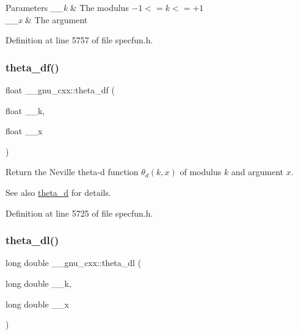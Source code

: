 \begin{DoxyParams}{Parameters}
{\em \+\_\+\+\_\+k} & The modulus $ -1 <= k <= +1 $ \\
\hline
{\em \+\_\+\+\_\+x} & The argument \\
\hline
\end{DoxyParams}


Definition at line 5757 of file specfun.\+h.

\mbox{\label{group__gnu__math__spec__func_gad2dc6fcaf54d25cbfaad082623941118}} 
\subsubsection{\texorpdfstring{theta\+\_\+df()}{theta\_df()}}
{\footnotesize\ttfamily float \+\_\+\+\_\+gnu\+\_\+cxx\+::theta\+\_\+df (\begin{DoxyParamCaption}\item[{float}]{\+\_\+\+\_\+k,  }\item[{float}]{\+\_\+\+\_\+x }\end{DoxyParamCaption})\hspace{0.3cm}{\ttfamily [inline]}}

Return the Neville theta-\/d function $ \theta_d(k,x) $ of modulus $ k $ and argument $ x $.

\begin{DoxySeeAlso}{See also}
\hyperlink{group__gnu__math__spec__func_ga258edb995137d9e6344b3cd750266d74}{theta\+\_\+d} for details. 
\end{DoxySeeAlso}


Definition at line 5725 of file specfun.\+h.

\mbox{\label{group__gnu__math__spec__func_gacce4474168b9638ebeaad1c7b351fa04}} 
\subsubsection{\texorpdfstring{theta\+\_\+dl()}{theta\_dl()}}
{\footnotesize\ttfamily long double \+\_\+\+\_\+gnu\+\_\+cxx\+::theta\+\_\+dl (\begin{DoxyParamCaption}\item[{long double}]{\+\_\+\+\_\+k,  }\item[{long double}]{\+\_\+\+\_\+x }\end{DoxyParamCaption})\hspace{0.3cm}{\ttfamily [inline]}}

